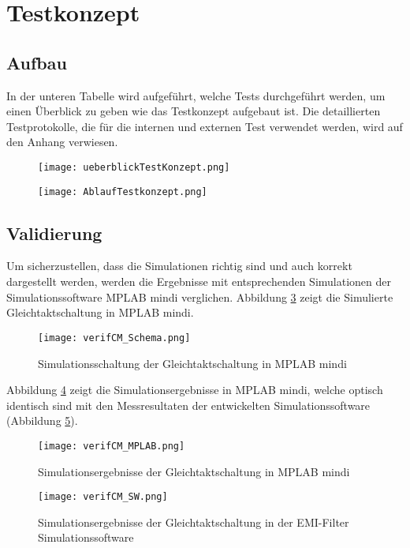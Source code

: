 \section{Testkonzept}\label{sec:testkonzept}

\subsection{Aufbau} \label{subsec:prinzip}

In der unteren Tabelle wird aufgeführt, welche Tests durchgeführt werden, um einen Überblick zu geben wie das Testkonzept aufgebaut ist. Die detaillierten Testprotokolle, die für die internen und externen Test verwendet werden, wird auf den Anhang verwiesen.  

\begin{figure}[H]
	\centering
	\texttt{[image: ueberblickTestKonzept.png]}
	\label{fig:Test3}
\end{figure}

\begin{figure}[H]
	\centering
	\texttt{[image: AblaufTestkonzept.png]}
	\label{fig:Test3}
\end{figure}



\newpage
\subsection{Validierung} \label{subsec:validierung}
Um sicherzustellen, dass die Simulationen richtig sind und auch korrekt dargestellt werden, werden die Ergebnisse mit entsprechenden Simulationen der Simulationssoftware MPLAB mindi verglichen. Abbildung \ref{fig:verifCM_Schema} zeigt die Simulierte Gleichtaktschaltung in MPLAB mindi.
\begin{figure}[H]
	\centering
	\texttt{[image: verifCM\_Schema.png]}
	\caption{Simulationsschaltung der Gleichtaktschaltung in MPLAB mindi}
	\label{fig:verifCM_Schema}
\end{figure}
 Abbildung \ref{fig:verifCM_MPLAB} zeigt die Simulationsergebnisse in MPLAB mindi, welche optisch identisch sind mit den Messresultaten der entwickelten Simulationssoftware (Abbildung \ref{fig:verifCM_SW}).
 \begin{figure}[H]
	\centering
	\texttt{[image: verifCM\_MPLAB.png]}
	\caption{Simulationsergebnisse der Gleichtaktschaltung in MPLAB mindi}
	\label{fig:verifCM_MPLAB}
\end{figure}
 \begin{figure}[H]
	\centering
	\texttt{[image: verifCM\_SW.png]}
	\caption{Simulationsergebnisse der Gleichtaktschaltung in der EMI-Filter Simulationssoftware}
	\label{fig:verifCM_SW}
\end{figure}


